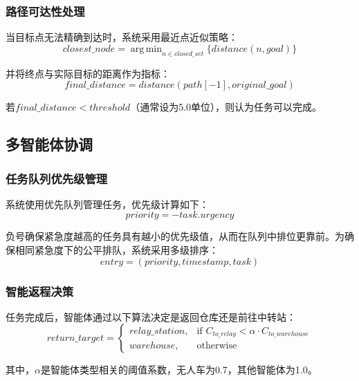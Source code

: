 \documentclass[12pt,a4paper]{article}
\DeclareMathOperator*{\argmin}{arg\,min}
\begin{document}
\subsubsection{路径可达性处理}

当目标点无法精确到达时，系统采用最近点近似策略：
\begin{equation}
closest\_node = \argmin_{n \in closed\_set} \{distance(n, goal)\}
\end{equation}

并将终点与实际目标的距离作为指标：
\begin{equation}
final\_distance = distance(path[-1], original\_goal)
\end{equation}

若$final\_distance < threshold$（通常设为5.0单位），则认为任务可以完成。

\subsection{多智能体协调}

\subsubsection{任务队列优先级管理}

系统使用优先队列管理任务，优先级计算如下：
\begin{equation}
priority = -task.urgency
\end{equation}

负号确保紧急度越高的任务具有越小的优先级值，从而在队列中排位更靠前。为确保相同紧急度下的公平排队，系统采用多级排序：
\begin{equation}
entry = (priority, timestamp, task)
\end{equation}

\subsubsection{智能返程决策}

任务完成后，智能体通过以下算法决定是返回仓库还是前往中转站：
\begin{equation}
return\_target = 
\begin{cases}
relay\_station, & \text{if } C_{to\_relay} < \alpha \cdot C_{to\_warehouse} \\
warehouse, & \text{otherwise}
\end{cases}
\end{equation}

其中，$\alpha$是智能体类型相关的阈值系数，无人车为0.7，其他智能体为1.0。
\end{document}
